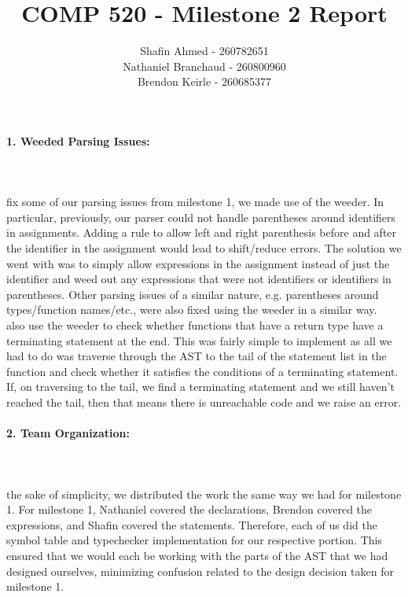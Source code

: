 \documentclass{article}
\begin{document}
\title{COMP 520 - Milestone 2 Report}
\author{Shafin Ahmed - 260782651\\Nathaniel Branchaud - 260800960\\Brendon Keirle - 260685377}
\maketitle
\paragraph{1. Weeded Parsing Issues:}\mbox{}\\\\
 fix some of our parsing issues from milestone 1, we made use of the weeder. In particular, previously, our parser could not handle parentheses around identifiers in assignments. Adding a rule to allow left and right parenthesis before and after the identifier in the assignment would lead to shift/reduce errors. The solution we went with was to simply allow expressions in the assignment instead of just the identifier and weed out any expressions that were not identifiers or identifiers in parentheses. Other parsing issues of a similar nature, e.g. parentheses around types/function names/etc., were also fixed using the weeder in a similar way. \\
 also use the weeder to check whether functions that have a return type have a terminating statement at the end. This was fairly simple to implement as all we had to do was traverse through the AST to the tail of the statement list in the function and check whether it satisfies the conditions of a terminating statement. If, on traversing to the tail, we find a terminating statement and we still haven't reached the tail, then that means there is unreachable code and we raise an error. 
\paragraph{2. Team Organization:}\mbox{}\\\\
 the sake of simplicity, we distributed the work the same way we had for milestone 1. For milestone 1, Nathaniel covered the declarations, Brendon covered the expressions, and Shafin covered the statements. Therefore, each of us did the symbol table and typechecker implementation for our respective portion. This ensured that we would each be working with the parts of the AST that we had designed ourselves, minimizing confusion related to the design decision taken for milestone 1.
\end{document}
